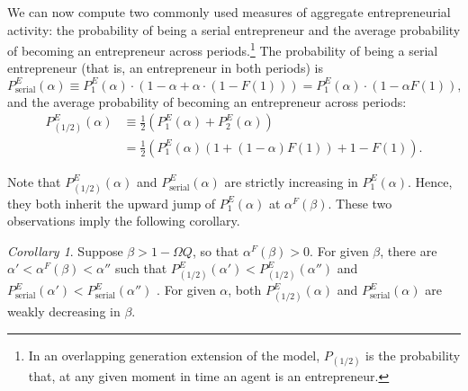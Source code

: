 \documentclass[12pt,american]{paper}
\theoremstyle{remark}
\newtheorem{cor}{Corollary}
\begin{document}
We can now compute two commonly used measures of aggregate entrepreneurial activity: the probability of being a serial entrepreneur and the average probability of becoming an entrepreneur across periods.\footnote{In an overlapping generation extension of the model, $P_{(1/2)}$ is the probability that, at any given moment in time an agent is an entrepreneur.}
The probability of being a serial entrepreneur (that is, an entrepreneur in both periods) is
$$
P_{\mbox{serial}}^E(\alpha)\equiv P_1^E(\alpha) \cdot (1-\alpha +  \alpha \cdot (1-F(1)))= P_1^E (\alpha)  \cdot \left(1-\alpha F(1) \right),
$$
and the average probability of becoming an entrepreneur across periods:
\begin{align*}
P_{(1/2)}^E(\alpha)&\equiv \frac{1}{2} \left( P_1^E(\alpha) + P_2^E(\alpha) \right)\\
&= \frac{1}{2} \left( P_1^E(\alpha) \left(1+(1-\alpha)F(1)\right) + 1 -F(1)  \right). 
\end{align*} 

Note that $P_{(1/2)}^E(\alpha)$ and $P_{\mbox{serial}}^E(\alpha)$ are strictly increasing in $P_1^E(\alpha)$. Hence,  they both inherit the upward jump of $ P_1^E(\alpha)$ at $\alpha^F(\beta)$. These two observations imply the following corollary.


\begin{cor}\label{prop:probability-of-entrepreneurship}
Suppose $\beta>1-\Omega Q$, so that $\alpha^F(\beta) > 0$. For given $\beta$, there are $\alpha'<\alpha^F(\beta)<\alpha''$ such that $P^E_{(1/2)}(\alpha')<P^E_{(1/2)}(\alpha'')$ and $P^E_{\mbox{serial}}(\alpha')<P^E_{\mbox{serial}}(\alpha'')$ . For given $\alpha$, both $P_{(1/2)}^E(\alpha)$ and $P_{\mbox{serial}}^E(\alpha)$ are weakly decreasing in $\beta$.
\end{cor}






\end{document}
